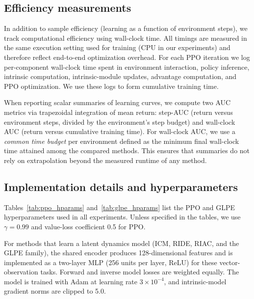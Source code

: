 \subsection{Efficiency measurements}
\label{sec:experimental_setup:efficiency}

In addition to sample efficiency (learning as a function of environment steps), we track computational efficiency using wall-clock time.
All timings are measured in the same execution setting used for training (CPU in our experiments) and therefore reflect end-to-end optimization overhead.
For each PPO iteration we log per-component wall-clock time spent in environment interaction, policy inference, intrinsic computation, intrinsic-module updates, advantage computation, and PPO optimization.
We use these logs to form cumulative training time.

When reporting scalar summaries of learning curves, we compute two AUC metrics via trapezoidal integration of mean return: step-AUC (return versus environment steps, divided by the environment's step budget) and wall-clock AUC (return versus cumulative training time).
For wall-clock AUC, we use a \emph{common time budget} per environment defined as the minimum final wall-clock time attained among the compared methods.
This ensures that summaries do not rely on extrapolation beyond the measured runtime of any method.

\subsection{Implementation details and hyperparameters}
\label{sec:experimental_setup:impl_details}

Tables~\ref{tab:ppo_hparams} and~\ref{tab:glpe_hparams} list the PPO and GLPE hyperparameters used in all experiments.
Unless specified in the tables, we use $\gamma=0.99$ and value-loss coefficient 0.5 for PPO.

For methods that learn a latent dynamics model (ICM, RIDE, RIAC, and the GLPE family), the shared encoder produces 128-dimensional features and is implemented as a two-layer MLP (256 units per layer, ReLU) for these vector-observation tasks.
Forward and inverse model losses are weighted equally.
The model is trained with Adam at learning rate $3\times 10^{-4}$, and intrinsic-model gradient norms are clipped to 5.0.


